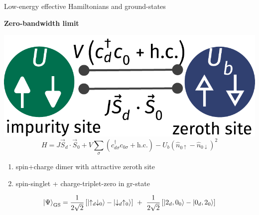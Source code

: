 \documentclass[8pt,aspectratio=169]{beamer}
\newcommand{\nitem}{\item[\ding{51}]}
\begin{document}
\begin{frame}{Low-energy effective Hamiltonians and ground-states}
{\vspace*{20pt}

{\Large \bf Zero-bandwidth limit}

\begin{minipage}{0.4\textwidth}
\includegraphics[width=\textwidth]{siam-JV.pdf}
\[H = J \vec{S}_d\cdot\vec{S}_0 + V \sum_\sigma \left( c^\dagger_{d\sigma}c_{0\sigma} + \text{h.c.} \right) - U_b\left( \hat n_{0 \uparrow} - \hat n_{0 \downarrow} \right)^2\]
\end{minipage}
\hspace*{\fill}
\begin{minipage}{0.45\textwidth}
\vspace*{\fill}
\begin{enumerate}
\nitem \alert{spin+charge} dimer with attractive zeroth site\\[6pt]
\nitem spin-singlet + charge-triplet-zero in gr-state\\[10pt]
\end{enumerate}
\[\ket{\Psi}_\text{GS} = \frac{1}{2\sqrt 2}\left[\ket{\uparrow_d \downarrow_0} - \ket{\downarrow_d \uparrow_0}\right] ~ + ~ \frac{1}{2\sqrt 2}\left[\ket{2_d, 0_0} - \ket{0_d, 2_0} \right] \]
\end{minipage}
}

\end{frame}
\end{document}
